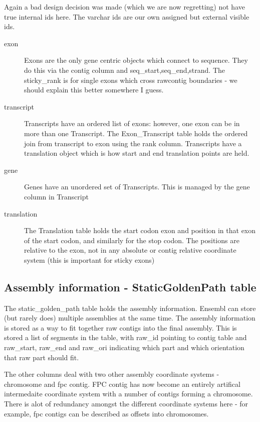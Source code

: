 \documentclass[11pt,a4paper]{article}
\begin{document}
Again a bad design decision was made (which we are now regretting) not have true
internal ids here. The varchar ids are our own assigned but external visible ids.

\begin{description}
\item[exon] Exons are the only gene centric objects which connect to
sequence.  They do this via the contig column and
seq\_start,seq\_end,strand. The sticky\_rank is for single exons which
cross rawcontig boundaries - we should explain this better somewhere 
I guess.
\item[transcript] Transcripts have an ordered list of exons: however, one
exon can be in more than one Transcript. The Exon\_Transcript table holds
the ordered join from transcript to exon using the rank column. Transcripts
have a translation object which is how start and end translation points
are held.
\item[gene] Genes have an unordered set of Transcripts. This is managed by
the gene column in Transcript
\item[translation] The Translation table holds the start codon exon and
position in that exon of the start codon, and similarly for the stop codon.
The positions are relative to the exon, not in any absolute or contig relative
coordinate system (this is important for sticky exons)
\end{description}

\subsection{Assembly information - StaticGoldenPath table}

The static\_golden\_path table holds the assembly information. Ensembl
can store (but rarely does) multiple assemblies at the same time. The
assembly information is stored as a way to fit together raw contigs
into the final assembly. This is stored a list of segments in the
table, with raw\_id pointing to contig table and raw\_start, raw\_end
and raw\_ori indicating which part and which orientation that raw part
should fit.

The other columns deal with two other assembly coordinate systems -
chromosome and fpc contig. FPC contig has now become an entirely
artifical intermedaite coordinate system with a number of contigs
forming a chromosome. There is alot of redundancy amongst the
different coordinate systems here - for example, fpc contigs can be
described as offsets into chromosomes.
\end{document}
